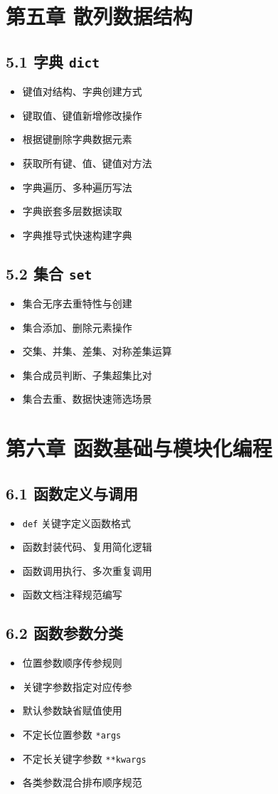 \section{第五章 散列数据结构}
\subsection{5.1 字典 \texttt{dict}}
\begin{itemize}
\item 键值对结构、字典创建方式
\item 键取值、键值新增修改操作
\item 根据键删除字典数据元素
\item 获取所有键、值、键值对方法
\item 字典遍历、多种遍历写法
\item 字典嵌套多层数据读取
\item 字典推导式快速构建字典
\end{itemize}

\subsection{5.2 集合 \texttt{set}}
\begin{itemize}
\item 集合无序去重特性与创建
\item 集合添加、删除元素操作
\item 交集、并集、差集、对称差集运算
\item 集合成员判断、子集超集比对
\item 集合去重、数据快速筛选场景
\end{itemize}

\section{第六章 函数基础与模块化编程}
\subsection{6.1 函数定义与调用}
\begin{itemize}
\item \texttt{def} 关键字定义函数格式
\item 函数封装代码、复用简化逻辑
\item 函数调用执行、多次重复调用
\item 函数文档注释规范编写
\end{itemize}

\subsection{6.2 函数参数分类}
\begin{itemize}
\item 位置参数顺序传参规则
\item 关键字参数指定对应传参
\item 默认参数缺省赋值使用
\item 不定长位置参数 \texttt{*args}
\item 不定长关键字参数 \texttt{**kwargs}
\item 各类参数混合排布顺序规范
\end{itemize}


